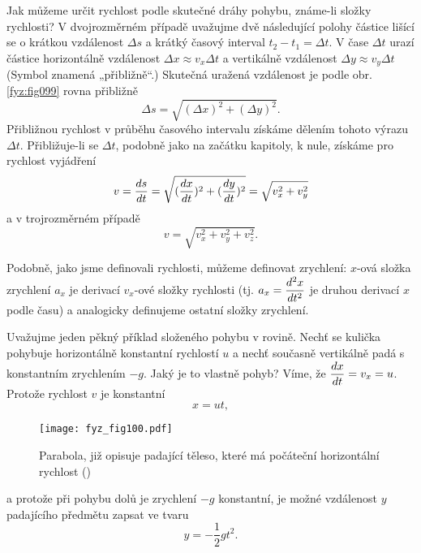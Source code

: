 {    Jak můžeme určit rychlost podle skutečné dráhy pohybu, známe-li složky rychlosti? V 
    dvojrozměrném případě uvažujme dvě následující polohy částice lišící se o krátkou vzdálenost 
    \(\Delta s\) a krátký časový interval \(t_2- t_1 = \Delta t\). V čase \(\Delta t\) urazí 
    částice horizontálně vzdálenost \(\Delta x \approx  v_x\Delta t\) a vertikálně vzdálenost 
    \(\Delta y \approx  v_y\Delta t\) (Symbol \uv{\(\approx\)} znamená „přibližně“.) Skutečná 
    uražená vzdálenost je podle obr. \ref{fyz:fig099} rovna přibližně
    \begin{equation}\label{FYZ:eq109}
      \Delta s = \sqrt{(\Delta x)^2 + (\Delta y)^2}.
    \end{equation}
    Přibližnou rychlost v průběhu časového intervalu získáme dělením tohoto výrazu \(\Delta t\). 
    Přibližuje-li se \(\Delta t\), podobně jako na začátku kapitoly, k nule, získáme pro rychlost 
    vyjádření
    \begin{equation}\label{FYZ:eq110}
      v = \dfrac{d s}{d t} = \sqrt{(\dfrac{d x}{d t})^2 + (\dfrac{d y}{d t})^2} = \sqrt{v_x^2 + v_y^2}
    \end{equation}
    a v trojrozměrném případě
    \begin{equation}\label{FYZ:eq097}
      v = \sqrt{v_x^2 + v_y^2 + v_z^2}.
    \end{equation}

    Podobně, jako jsme definovali rychlosti, můžeme definovat zrychlení: \(x\)-ová složka zrychlení 
    \(a_x\) je derivací \(v_x\)-ové složky rychlosti (tj. \(a_x = \dfrac{d^2 x}{d t^2}\) je druhou derivací 
    \(x\) podle času) a analogicky definujeme ostatní složky zrychlení.

    Uvažujme jeden pěkný příklad složeného pohybu v rovině. Nechť se kulička pohybuje horizontálně 
    konstantní rychlostí \(u\) a nechť současně vertikálně padá s konstantním zrychlením \(-g\). 
    Jaký je to vlastně pohyb? Víme, že \(\dfrac{d x}{d t} = v_x = u\). Protože rychlost \(v\) je 
    konstantní
    \begin{equation}\label{FYZ:eq100}
      x = ut,
    \end{equation}

    \begin{wrapfigure}[12]{r}{5cm}  %
      \centering
      \texttt{[image: fyz\_fig100.pdf]}
      \caption{Parabola, již opisuje padající těleso, které má počáteční horizontální rychlost
               (\cite[s.~119]{Feynman01})}
      \label{fyz:fig100}
    \end{wrapfigure}
    a protože při pohybu dolů je zrychlení \(-g\) konstantní, je možné vzdálenost \(y\) padajícího 
    předmětu zapsat ve tvaru
    \begin{equation}\label{FYZ:eq098}
      y = -\frac{1}{2}gt^2.
    \end{equation}
    
}
